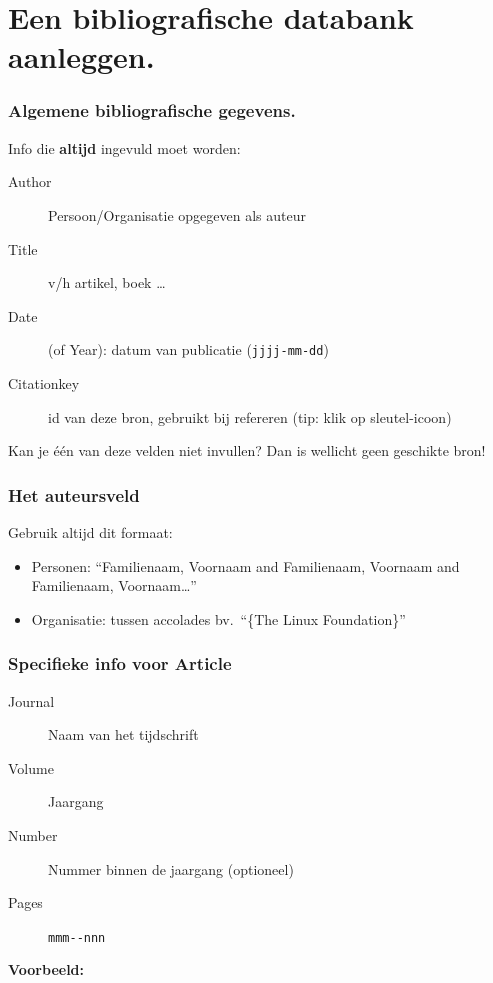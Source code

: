 \documentclass[aspectratio=169]{beamer}
\begin{document}
\section{Een bibliografische databank aanleggen.}

\begin{frame}
  \frametitle{Algemene bibliografische gegevens.}

  Info die \textbf{altijd} ingevuld moet worden:

  \begin{description}
    \item[Author] Persoon/Organisatie opgegeven als auteur
    \item[Title] v/h artikel, boek \ldots
    \item[Date] (of Year): datum van publicatie (\texttt{jjjj-mm-dd})
    \item[Citationkey] id van deze bron, gebruikt bij refereren (tip: klik op sleutel-icoon)
  \end{description}

  \bigskip

  Kan je één van deze velden niet invullen? Dan is wellicht geen geschikte bron!
\end{frame}

\begin{frame}
  \frametitle{Het auteursveld}

  Gebruik altijd dit formaat:

  \begin{itemize}
    \item Personen: ``Familienaam, Voornaam and Familienaam, Voornaam and Familienaam, Voornaam\ldots''
    \item Organisatie: tussen accolades bv.\ ``\{The Linux Foundation\}''
  \end{itemize}

\end{frame}

\begin{frame}
  \frametitle{Specifieke info voor Article}

  \begin{description}
    \item[Journal] Naam van het tijdschrift
    \item[Volume] Jaargang
    \item[Number] Nummer binnen de jaargang (optioneel)
    \item[Pages] \verb|mmm--nnn|
  \end{description}

  \bigskip

  \textbf{Voorbeeld:}

\end{frame}
\end{document}
